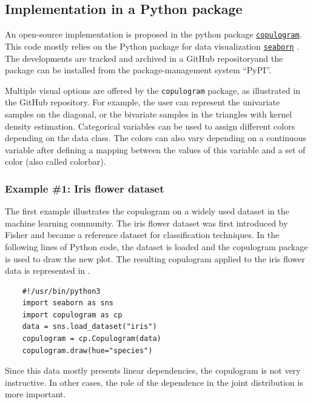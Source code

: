 \subsection{Implementation in a Python package}

An open-source implementation is proposed in the python package \href{https://github.com/efekhari27/copulogram}{\texttt{copulogram}}. 
This code mostly relies on the Python package for data visualization \href{https://seaborn.pydata.org/}{\texttt{seaborn}} \citep{waskom_2021_seaborn}. 
The developments are tracked and archived in a GitHub repository\footnotemark and the package can be installed from the package-management system ``PyPI''. 

Multiple visual options are offered by the \texttt{copulogram} package, as illustrated in the GitHub repository. 
For example, the user can represent the univariate samples on the diagonal, or the bivariate samples in the triangles with kernel density estimation.  
Categorical variables can be used to assign different colors depending on the data class. 
The colors can also vary depending on a continuous variable after defining a mapping between the values of this variable and a set of color (also called colorbar).






\subsubsection{Example \#1: Iris flower dataset}

The first example illustrates the copulogram on a widely used dataset in the machine learning community. 
The iris flower dataset was first introduced by Fisher and became a reference dataset for classification techniques. 
In the following lines of Python code, the dataset is loaded and the copulogram package is used to draw the new plot. 
The resulting copulogram applied to the iris flower data is represented in . 
\lstset{style=mystyle, language=python}
%
\begin{lstlisting}
    #!/usr/bin/python3        
    import seaborn as sns
    import copulogram as cp
    data = sns.load_dataset("iris")
    copulogram = cp.Copulogram(data)
    copulogram.draw(hue="species")
\end{lstlisting}
%
Since this data mostly presents linear dependencies, the copulogram is not very instructive. 
In other cases, the role of the dependence in the joint distribution is more important.



